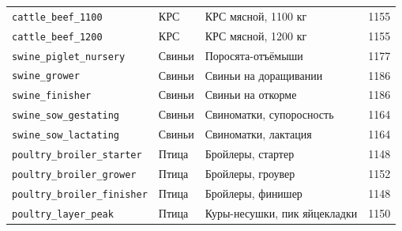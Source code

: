 \documentclass[11pt]{article}
\begin{document}
\begin{longtable}{lllc}
\texttt{cattle\_beef\_1100} & КРС & КРС мясной, 1100 кг & 1155 \\
\texttt{cattle\_beef\_1200} & КРС & КРС мясной, 1200 кг & 1155 \\
\texttt{swine\_piglet\_nursery} & Свиньи & Поросята-отъёмыши & 1177 \\
\texttt{swine\_grower} & Свиньи & Свиньи на доращивании & 1186 \\
\texttt{swine\_finisher} & Свиньи & Свиньи на откорме & 1186 \\
\texttt{swine\_sow\_gestating} & Свиньи & Свиноматки, супоросность & 1164 \\
\texttt{swine\_sow\_lactating} & Свиньи & Свиноматки, лактация & 1164 \\
\texttt{poultry\_broiler\_starter} & Птица & Бройлеры, стартер & 1148 \\
\texttt{poultry\_broiler\_grower} & Птица & Бройлеры, гроувер & 1152 \\
\texttt{poultry\_broiler\_finisher} & Птица & Бройлеры, финишер & 1148 \\
\texttt{poultry\_layer\_peak} & Птица & Куры-несушки, пик яйцекладки & 1150 \\
\end{longtable}
\end{document}
